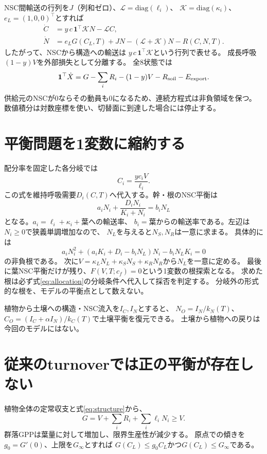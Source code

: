 \documentclass[a4paper,11pt]{ltjsarticle}
\begin{document}
NSC間輸送の行列を$J$（列和ゼロ）、$\mathcal L=\mathrm{diag}(\ell_i)$、
$\mathcal K=\mathrm{diag}(\kappa_i)$、$e_L=(1,0,0)^\top$とすれば
\begin{align}
\dot C&=y\,c\,\boldsymbol{1}^{\top}\mathcal K N-\mathcal L C,\\
\dot N&=e_LG(C_L,T)+JN-(\mathcal L+\mathcal K)N-R(C,N,T).
\label{eq:nsc}
\end{align}
したがって、NSCから構造への輸送は
$y\,c\,\boldsymbol{1}^{\top}\mathcal K$という行列で表せる。
成長呼吸$(1-y)V$を外部損失として分離する。
全8状態では
\[
\boldsymbol{1}^{\top}\dot X
=G-\sum_iR_i-(1-y)V-R_{\rm soil}-E_{\rm export}.
\]
供給元のNSCが0ならその動員も0になるため、連続方程式は非負領域を保つ。
数値積分は対数座標を使い、切替面に到達した場合には停止する。

\section{平衡問題を1変数に縮約する}
配分率を固定した各分岐では
\begin{equation}
C_i=\frac{yc_iV}{\ell_i}.
\label{eq:structure}
\end{equation}
この式を維持呼吸需要$D_i(C,T)$へ代入する。幹・根のNSC平衡は
\[
a_iN_i+\frac{D_iN_i}{K_i+N_i}=b_iN_L
\]
となる。$a_i=\ell_i+\kappa_i+$葉への輸送率、
$b_i=$葉からの輸送率である。左辺は$N_i\ge0$で狭義単調増加なので、
$N_L$を与えると$N_S,N_R$は一意に求まる。
具体的には
\[
a_iN_i^2+(a_iK_i+D_i-b_iN_L)N_i-b_iN_LK_i=0
\]
の非負根である。
次に$V=\kappa_LN_L+\kappa_SN_S+\kappa_RN_R$から$N_L$を一意に定める。
最後に葉NSC平衡だけが残り、$F(V,T;c_f)=0$という1変数の根探索となる。
求めた根は必ず式\eqref{eq:allocation}の分岐条件へ代入して採否を判定する。
分岐外の形式的な根を、モデルの平衡点として数えない。

植物から土壌への構造・NSC流入を$I_C,I_N$とすると、
$N_O=I_N/k_N(T)$、$C_O=(I_C+\alpha I_N)/k_C(T)$で土壌平衡を復元できる。
土壌から植物への戻りは今回のモデルにはない。

\section{従来のturnoverでは正の平衡が存在しない}
植物全体の定常収支と式\eqref{eq:structure}から、
\begin{equation}
G=V+\sum_iR_i+\sum_i\ell_iN_i\ge V.
\label{eq:bound}
\end{equation}
群落GPPは葉量に対して増加し、限界生産性が減少する。
原点での傾きを$g_0=G'(0)$、上限を$G_\infty$とすれば
$G(C_L)\le g_0C_L$かつ$G(C_L)\le G_\infty$である。
\end{document}

